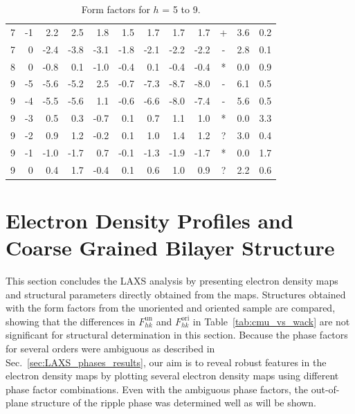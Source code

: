 \begin{table}[htbp]
\begin{tabular}{rrrrrrrrrcrr}
7 & -1 & 2.2 & 2.5 & 1.8 & 1.5 & 1.7 & 1.7 & 1.7 & + & 3.6 & 0.2 \\ 
7 & 0 & -2.4 & -3.8 & -3.1 & -1.8 & -2.1 & -2.2 & -2.2 & - & 2.8 & 0.1 \\ 
8 & 0 & -0.8 & 0.1 & -1.0 & -0.4 & 0.1 & -0.4 & -0.4 & * & 0.0 & 0.9 \\ 
9 & -5 & -5.6 & -5.2 & 2.5 & -0.7 & -7.3 & -8.7 & -8.0 & - & 6.1 & 0.5 \\ 
9 & -4 & -5.5 & -5.6 & 1.1 & -0.6 & -6.6 & -8.0 & -7.4 & - & 5.6 & 0.5 \\ 
9 & -3 & 0.5 & 0.3 & -0.7 & 0.1 & 0.7 & 1.1 & 1.0 & * & 0.0 & 3.3 \\ 
9 & -2 & 0.9 & 1.2 & -0.2 & 0.1 & 1.0 & 1.4 & 1.2 & ? & 3.0 & 0.4 \\ 
9 & -1 & -1.0 & -1.7 & 0.7 & -0.1 & -1.3 & -1.9 & -1.7 & * & 0.0 & 1.7 \\ 
9 & 0 & 0.4 & 1.7 & -0.4 & 0.1 & 0.6 & 1.0 & 0.9 & ? & 2.2 & 0.6 \\ 
\hline
\end{tabular}
\caption[Form factors for $h$ = 5 to 9]
{Form factors for $h$ = 5 to 9.}
\label{tab:LAXS_fits2}
\end{table}

\newpage
\section{Electron Density Profiles and Coarse Grained Bilayer Structure}\label{sec:LAXS_edp}
This section concludes the LAXS analysis by 
presenting electron density maps  and structural parameters directly obtained from the maps. 
Structures obtained with the form factors from the unoriented and 
oriented sample are compared, showing that the differences in $F_{hk}^\text{un}$
and $F_{hk}^\text{ori}$ in Table~\ref{tab:cmu_vs_wack} are not significant for 
structural determination in this section.
Because the phase factors for several orders were ambiguous as described in Sec.~\ref{sec:LAXS_phases_results}, 
our aim is to reveal robust features in the electron density maps by plotting several 
electron density maps
using different phase factor combinations. 
Even with the ambiguous phase factors, 
the out-of-plane structure of the ripple phase was determined well as will be shown.

